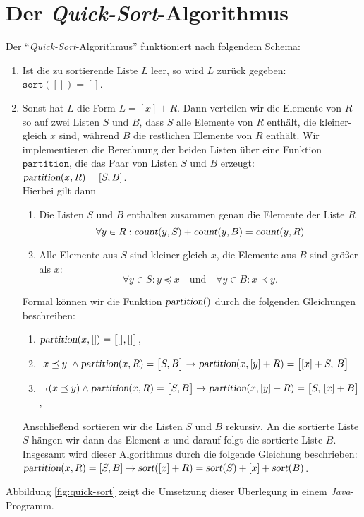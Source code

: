 \section{Der \emph{Quick-Sort}-Algorithmus}
Der ``\emph{Quick-Sort}-Algorithmus'' funktioniert nach folgendem Schema:
\begin{enumerate}
\item Ist die zu sortierende Liste $L$ leer, so wird $L$
      zur\"uck gegeben: \\[0.1cm]
      \hspace*{1.3cm} $\mathtt{sort}([]) = []$.
\item Sonst hat $L$ die Form $L = [x] + R$.
      Dann verteilen wir die Elemente von $R$ so auf zwei Listen $S$ und $B$, 
      dass $S$ alle Elemente von $R$ enth\"alt, die kleiner-gleich $x$ sind, w\"ahrend $B$ die
      restlichen Elemente von $R$ enth\"alt. 
      Wir implementieren die Berechnung der beiden Listen \"uber eine Funktion
      $\mathtt{partition}$, die das Paar von Listen $S$ und $B$ erzeugt: 
      \\[0.2cm]
      \hspace*{1.3cm}
      $\textsl{partition}(x,R) = [S,B]$.
      \\[0.2cm]
      Hierbei gilt dann 
      \begin{enumerate}
      \item Die Listen $S$ und $B$ enthalten zusammen genau die Elemente der Liste $R$
            \[ \forall y \in R: \textsl{count}(y,S) + \textsl{count}(y,B) = \textsl{count}(y,R) \]
      \item Alle Elemente aus $S$ sind kleiner-gleich $x$, die Elemente aus $B$ sind
            gr\"o\ss{}er als $x$:
            \[ \forall y \in S: y \preceq x \quad \mbox{und} \quad \forall y \in B: x \prec y. \]
      \end{enumerate}
      Formal k\"onnen wir die Funktion $\textsl{partition}()$ durch die folgenden
      Gleichungen beschreiben:
      \begin{enumerate}
      \item $\textsl{partition}(x, []) = \bigl[[], []\bigr]$,
      \item \quad $\; x \preceq y\; \wedge \textsl{partition}(x,R) = \bigl[ S, B \bigr] \rightarrow 
             \textsl{partition}(x, [y] + R) = \bigl[ [x] + S,\, B \bigr]$
      \item $\neg\, (x \preceq y) \wedge \textsl{partition}(x,R) = \bigl[ S, B \bigr] \rightarrow 
             \textsl{partition}(x, [y] + R) = \bigl[ S,\, [x] + B \bigr]$,
      \end{enumerate}
      Anschlie\ss{}end sortieren wir die Listen $S$ und $B$ rekursiv.
      An die sortierte Liste $S$ h\"angen wir dann das Element $x$ und darauf folgt die
      sortierte Liste $B$.  Insgesamt wird dieser Algorithmus durch die folgende Gleichung
      beschrieben:
      \\[0.2cm]
      \hspace*{1.3cm}
      $\textsl{partition}(x,R) = [S,B] \rightarrow 
       \textsl{sort}([x] + R) = \textsl{sort}(S) + [x] + \textsl{sort}(B)$.
\end{enumerate}
Abbildung \ref{fig:quick-sort} zeigt die Umsetzung dieser Überlegung 
in einem \textsl{Java}-Programm.

